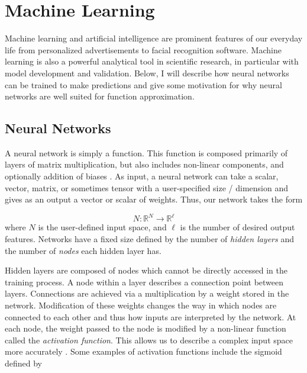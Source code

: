 \documentclass{CUP-JNL-DTM}%
\theoremstyle{definition}
\numberwithin{equation}{section}
\begin{document}

\section{Machine Learning}

Machine learning and artificial intelligence are prominent features of our everyday life from personalized advertisements to facial recognition software. Machine learning is also a powerful analytical tool in scientific research, in particular with model development and validation. Below, I will describe how neural networks can be trained to make predictions and give some motivation for why neural networks are well suited for function approximation. 


\subsection{Neural Networks}

A neural network is simply a function. This function is composed primarily of layers of matrix multiplication, but also includes non-linear components, and optionally addition of biases \cite{strangLinearAlgebraLearning2019, bishopPatternRecognitionMachine2006}. As input, a neural network can take a scalar, vector, matrix, or sometimes tensor with a user-specified size / dimension and gives as an output a vector or scalar of weights. Thus, our network takes the form

\begin{equation}
    N : \mathbb{R}^{N} \rightarrow \mathbb{R}^{\ell}
\end{equation}
where $N$ is the user-defined input space, and $\ell$ is the number of desired output features. Networks have a fixed size defined by the number of \emph{hidden layers} and the number of \emph{nodes} each hidden layer has. 

Hidden layers are composed of nodes which cannot be directly accessed in the training process. A node within a layer describes a connection point between layers. Connections are achieved via a multiplication by a weight stored in the network. Modification of these weights changes the way in which nodes are connected to each other and thus how inputs are interpreted by the network. At each node, the weight passed to the node is modified by a non-linear function called the \emph{activation function}. This allows us to describe a complex input space more accurately \cite{dubeyActivationFunctionsDeep2022a}. Some examples of activation functions include the sigmoid defined by 
\end{document}
